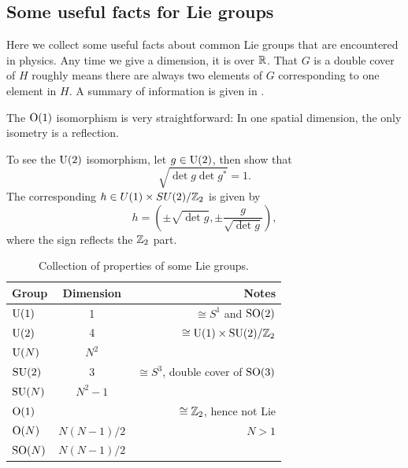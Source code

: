 \subsection{Some useful facts for Lie groups}

Here we collect some useful facts about common Lie groups that are encountered
in physics. Any time we give a dimension, it is over $\mathbb{R}$. 
That $G$ is a double cover of $H$ roughly means there are always two 
elements of $G$ corresponding to one element in
$H$. A summary of information is given in .

The $\operatorname{\text{O}}(1)$ isomorphism is very straightforward: In one spatial dimension, the
only isometry is a reflection.

To see the $\operatorname{U}(2)$ isomorphism, let $g\in\operatorname{U}(2)$, then show that
\begin{equation}
\sqrt{\det g\det g^*}=1.
\end{equation} 
The corresponding
$h\in U(1)\times SU(2)/\mathbb{Z}_2$ is given by
\begin{equation}
h=\left(\pm\sqrt{\det g},\pm\frac{g}{\sqrt{\det g}}\right),
\end{equation} 
where the sign reflects the $\mathbb{Z}_2$ part.

\begin{table}
\centering
\caption{Collection of properties of some Lie groups. }
\begin{tabularx}{\linewidth}{lCr}
\hline\hline
Group & Dimension & Notes\\
\hline
$\operatorname{U}(1)$  & 1          & $\cong S^1$ and $\operatorname{SO}(2)$\\
$\operatorname{U}(2)$  & 4          & $\cong \operatorname{U}(1)\times \operatorname{SU}(2)/\mathbb{Z}_2$\\
$\operatorname{U}(N)$  & $N^2$      & \\ 
$\operatorname{SU}(2)$ & 3          & $\cong S^3$, double cover of $\operatorname{SO}(3)$\\
$\operatorname{SU}(N)$ & $N^2-1$    & \\
$\operatorname{\text{O}}(1)$ &            & $\cong\mathbb{Z}_2$, hence not Lie\\
$\operatorname{\text{O}}(N)$ & $N(N-1)/2$ & $N>1$\\
$\operatorname{SO}(N)$ & $N(N-1)/2$ & \\
\hline\hline
\end{tabularx}
\label{tab:lie}
\end{table}




 

